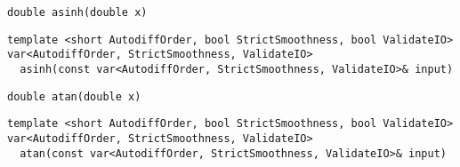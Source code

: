 \begin{tcolorbox}[colback=white,colframe=gray90, coltitle=black,boxrule=3pt,
fonttitle=\bfseries,title= Asinh]

\begin{verbatim}
double asinh(double x)

\end{verbatim}

\begin{verbatim}
template <short AutodiffOrder, bool StrictSmoothness, bool ValidateIO>
var<AutodiffOrder, StrictSmoothness, ValidateIO>
  asinh(const var<AutodiffOrder, StrictSmoothness, ValidateIO>& input)

\end{verbatim}

\end{tcolorbox}

\begin{tcolorbox}[colback=white,colframe=gray90, coltitle=black,boxrule=3pt,
fonttitle=\bfseries,title= Atan]

\begin{verbatim}
double atan(double x)

\end{verbatim}

\begin{verbatim}
template <short AutodiffOrder, bool StrictSmoothness, bool ValidateIO>
var<AutodiffOrder, StrictSmoothness, ValidateIO>
  atan(const var<AutodiffOrder, StrictSmoothness, ValidateIO>& input)

\end{verbatim}

\end{tcolorbox}

